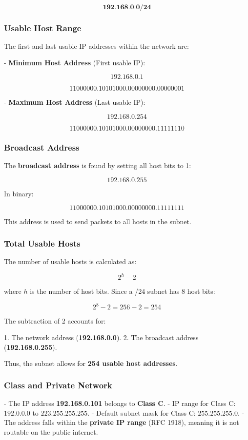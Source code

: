 \documentclass[a4paper,12pt]{article}
\begin{document}
\[
\textbf{192.168.0.0/24}
\]

\subsubsection{Usable Host Range}
The first and last usable IP addresses within the network are:

- \textbf{Minimum Host Address} (First usable IP):
  
  \[
  \text{192.168.0.1}
  \]

  \[
  \text{11000000.10101000.00000000.00000001}
  \]

- \textbf{Maximum Host Address} (Last usable IP):

  \[
  \text{192.168.0.254}
  \]

  \[
  \text{11000000.10101000.00000000.11111110}
  \]

\subsubsection{Broadcast Address}
The \textbf{broadcast address} is found by setting all host bits to 1:

\[
\text{192.168.0.255}
\]

In binary:

\[
\text{11000000.10101000.00000000.11111111}
\]

This address is used to send packets to all hosts in the subnet.

\subsubsection{Total Usable Hosts}
The number of usable hosts is calculated as:

\[
2^h - 2
\]

where \( h \) is the number of host bits. Since a /24 subnet has \( 8 \) host bits:

\[
2^8 - 2 = 256 - 2 = 254
\]

The subtraction of 2 accounts for:

1. The network address (\textbf{192.168.0.0}).
2. The broadcast address (\textbf{192.168.0.255}).

Thus, the subnet allows for \textbf{254 usable host addresses}.

\subsubsection{Class and Private Network}
- The IP address \textbf{192.168.0.101} belongs to \textbf{Class C}.
- IP range for Class C: \( 192.0.0.0 \) to \( 223.255.255.255 \).
- Default subnet mask for Class C: \( 255.255.255.0 \).
- The address falls within the \textbf{private IP range} (RFC 1918), meaning it is not routable on the public internet.
\end{document}
